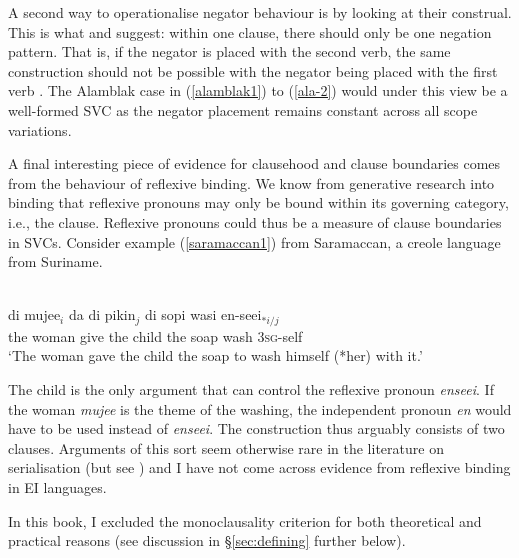 A second way to operationalise negator behaviour is by looking at their construal. This is what \citet{haspelmath2016serial} and  \citet{bohnemeyer2007principles} suggest: within one clause, there should only be one negation pattern. That is, if the negator is placed with the second verb, the same construction should not be possible with the negator being placed with the first verb \citep{haspelmath2016serial}. The Alamblak case in (\ref{alamblak1}) to (\ref{ala-2}) would under this view be a well-formed SVC as the negator placement remains constant across all scope variations.

A final interesting piece of evidence for clausehood and clause boundaries comes from the behaviour of reflexive binding. We know from generative research into binding that reflexive pronouns may only be bound within its governing category, i.e., the clause. Reflexive pronouns could thus be a measure of clause boundaries in SVCs. Consider example (\ref{saramaccan1}) from Saramaccan, a creole language from Suriname.

\ea \label{saramaccan1}
\\
\gll di mujee$_i$ da di pikin$_j$ di sopi wasi en-seei$_{*i/j}$ \\
the woman give the child the soap wash \textsc{3}\textsc{sg}-self \\
\glft `The woman gave the child the soap to wash himself (*her) with it.'\\ 
\z

The child is the only argument that can control the reflexive pronoun \textit{enseei}. If the woman \textit{mujee} is the theme of the washing, the independent pronoun \textit{en} would have to be used instead of \textit{enseei}. The construction thus arguably consists of two clauses. Arguments of this sort seem otherwise rare in the literature on serialisation (but see \citealt[514]{baker1989object}) and I have not come across evidence from reflexive binding in EI languages. 

In this book, I excluded the monoclausality criterion for both theoretical and practical reasons (see discussion in §\ref{sec:defining} further below).


